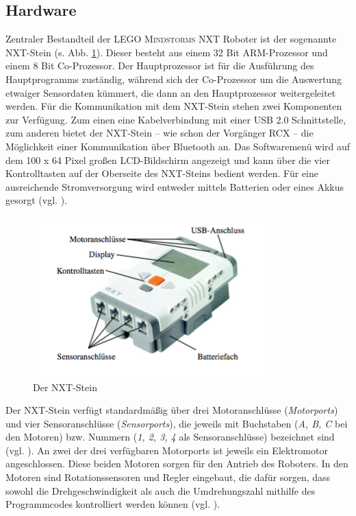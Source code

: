 \documentclass[paper=a4, DIV=calc, BCOR=12mm, twoside=on, onecolumn=on, open = right, titlepage =on, parskip =half-, headsepline = on, footsepline = off, chapterprefix = off, appendixprefix = on, fontsize = 12pt, numbers = noenddot, abstract = on]{scrbook}
\begin{document}
\subsection{Hardware}
\onehalfspacing
Zentraler Bestandteil der \textsc{LEGO Mindstorms} NXT Roboter ist der sogenannte NXT-Stein (s. Abb. \ref{fig:NXT Stein}). Dieser besteht aus einem 32 Bit ARM-Prozessor und einem 8 Bit Co-Prozessor. Der Hauptprozessor ist für die Ausführung des Hauptprogramms zuständig, während sich der Co-Prozessor um die Auswertung etwaiger Sensordaten kümmert, die dann an den Hauptprozessor weitergeleitet werden. Für die Kommunikation mit dem NXT-Stein stehen zwei Komponenten zur Verfügung. Zum einen eine Kabelverbindung mit einer USB 2.0 Schnittstelle, zum anderen bietet der NXT-Stein -- wie schon der Vorgänger RCX -- die Möglichkeit einer Kommunikation über Bluetooth an. Das Softwaremenü wird auf dem 100 x 64 Pixel großen LCD-Bildschirm angezeigt und kann über die vier Kontrolltasten auf der Oberseite des NXT-Steins bedient werden. Für eine ausreichende Stromversorgung wird entweder mittels Batterien oder eines Akkus gesorgt (vgl. \cite[S.42]{berns:10}).

\begin{figure}[htb]
\centering
\includegraphics[scale=0.7]{images/NXT-Stein.png} 
\caption[Der NXT-Stein]{Der NXT-Stein \cite[S. 42]{berns:10}}
\label{fig:NXT Stein}
\end{figure}

Der NXT-Stein verfügt standardmäßig über drei Motoranschlüsse (\emph{Motorports}) und vier Sensoranschlüsse (\emph{Sensorports}), die jeweils mit Buchstaben (\emph{A, B, C} bei den Motoren) bzw. Nummern (\emph{1, 2, 3, 4} als Sensoranschlüsse) bezeichnet sind (vgl.  \cite[S.43]{berns:10}). An zwei der drei verfügbaren Motorports ist jeweils ein Elektromotor angeschlossen. Diese beiden Motoren sorgen für den Antrieb des Roboters. In den Motoren sind Rotationssensoren und Regler eingebaut, die dafür sorgen, dass sowohl die Drehgeschwindigkeit als auch die Umdrehungszahl mithilfe des Programmcodes kontrolliert werden können (vgl. \cite[S.45ff.]{berns:10}).
\end{document}

